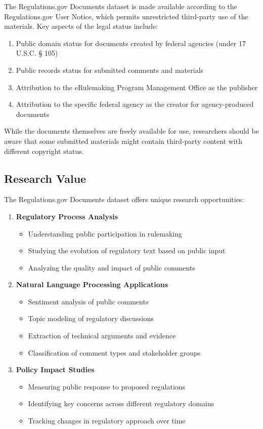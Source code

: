 The Regulations.gov Documents dataset is made available according to the Regulations.gov User Notice, which permits unrestricted third-party use of the materials. Key aspects of the legal status include:

\begin{enumerate}
    \item Public domain status for documents created by federal agencies (under 17 U.S.C. § 105)
    \item Public records status for submitted comments and materials
    \item Attribution to the eRulemaking Program Management Office as the publisher
    \item Attribution to the specific federal agency as the creator for agency-produced documents
\end{enumerate}

While the documents themselves are freely available for use, researchers should be aware that some submitted materials might contain third-party content with different copyright status.

\subsection{Research Value}

The Regulations.gov Documents dataset offers unique research opportunities:

\begin{enumerate}
    \item \textbf{Regulatory Process Analysis}
    \begin{itemize}
        \item Understanding public participation in rulemaking
        \item Studying the evolution of regulatory text based on public input
        \item Analyzing the quality and impact of public comments
    \end{itemize}
    
    \item \textbf{Natural Language Processing Applications}
    \begin{itemize}
        \item Sentiment analysis of public comments
        \item Topic modeling of regulatory discussions
        \item Extraction of technical arguments and evidence
        \item Classification of comment types and stakeholder groups
    \end{itemize}
    
    \item \textbf{Policy Impact Studies}
    \begin{itemize}
        \item Measuring public response to proposed regulations
        \item Identifying key concerns across different regulatory domains
        \item Tracking changes in regulatory approach over time
    \end{itemize}
\end{enumerate}

